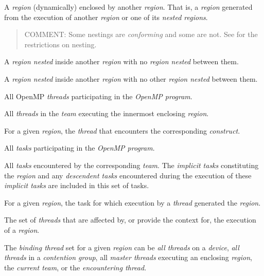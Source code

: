 \glossarydefstart
A \emph{region} (dynamically) enclosed by another \emph{region}.  That is, a
\emph{region} generated from the execution of another \emph{region}
or one of its \emph{nested regions}.

\begin{quote}
COMMENT: Some nestings are \emph{conforming} and some are not.
See  for the restrictions on nesting.
\end{quote}
\glossarydefend

\glossarydefstart
A \emph{region nested} inside another \emph{region} with no  
\emph{region nested} between them.
\glossarydefend

\glossarydefstart
A \emph{region nested} inside another \emph{region} with no other 
\emph{region nested} between them.
\glossarydefend

\glossarydefstart
All OpenMP \emph{threads} participating in the \emph{OpenMP program}.
\glossarydefend

\glossarydefstart
All \emph{threads} in the \emph{team} executing the innermost 
enclosing  \emph{region}.
\glossarydefend

\glossarydefstart
For a given \emph{region}, the \emph{thread} that encounters the
corresponding \emph{construct}.
\glossarydefend

\glossarydefstart
All \emph{tasks} participating in the \emph{OpenMP program}.
\glossarydefend

\glossarydefstart
All \emph{tasks} encountered by the corresponding \emph{team}. The 
\emph{implicit tasks} constituting the  \emph{region} 
and any \emph{descendent tasks} encountered during the execution of 
these \emph{implicit tasks} are included in this set of tasks.
\glossarydefend

\glossarydefstart
For a given \emph{region}, the task for which execution by a 
\emph{thread} generated the \emph{region}.
\glossarydefend

\glossarydefstart
The set of \emph{threads} that are affected by, or provide the context 
for, the execution of a \emph{region}.

The \emph{binding thread} set for a given \emph{region} can be 
\emph{all threads} on a \emph{device}, \emph{all threads} in a 
\emph{contention group}, all \emph{master threads} executing an
enclosing  \emph{region}, the \emph{current team}, 
or the \emph{encountering thread}.

